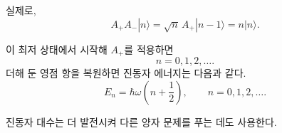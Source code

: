 실제로,
\begin{equation}
A_+A_-|n\rangle
=\sqrt n\,A_+|n-1\rangle
=n|n\rangle.
\end{equation}

\begin{classroomqa}\end{classroomqa}


이 최저 상태에서 시작해 \(A_+\)를 적용하면
\begin{equation}
n=0,1,2,\ldots.
\end{equation}
더해 둔 영점 항을 복원하면 진동자 에너지는 다음과 같다.
\begin{equation}
E_n=\hbar\omega\left(n+\frac{1}{2}\right),
\qquad n=0,1,2,\ldots.
\end{equation}

진동자 대수는 더 발전시켜 다른 양자 문제를 푸는 데도 사용한다.
